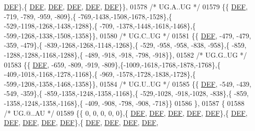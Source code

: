 \begin{DoxyCode}
      \mbox{\hyperlink{1_88_84__epars_8h_a397419fc12b37ed479c8abb9d444d843}{DEF}}\},\{  \mbox{\hyperlink{1_88_84__epars_8h_a397419fc12b37ed479c8abb9d444d843}{DEF}},  \mbox{\hyperlink{1_88_84__epars_8h_a397419fc12b37ed479c8abb9d444d843}{DEF}},  \mbox{\hyperlink{1_88_84__epars_8h_a397419fc12b37ed479c8abb9d444d843}{DEF}},  \mbox{\hyperlink{1_88_84__epars_8h_a397419fc12b37ed479c8abb9d444d843}{DEF}},  \mbox{\hyperlink{1_88_84__epars_8h_a397419fc12b37ed479c8abb9d444d843}{DEF}}\}\},
01578 \textcolor{comment}{/* UG.A..UG */}
01579 \{\{  \mbox{\hyperlink{1_88_84__epars_8h_a397419fc12b37ed479c8abb9d444d843}{DEF}}, -719, -789, -959, -809\},\{ -769,-1438,-1508,-1678,-1528\},\{ -529,-1198,-1268,-1438,-1288\},\{ -709,
      -1378,-1448,-1618,-1468\},\{ -599,-1268,-1338,-1508,-1358\}\},
01580 \textcolor{comment}{/* UG.C..UG */}
01581 \{\{  \mbox{\hyperlink{1_88_84__epars_8h_a397419fc12b37ed479c8abb9d444d843}{DEF}}, -479, -479, -359, -479\},\{ -839,-1268,-1268,-1148,-1268\},\{ -529, -958, -958, -838, -958\},\{ -859,
      -1288,-1288,-1168,-1288\},\{ -489, -918, -918, -798, -918\}\},
01582 \textcolor{comment}{/* UG.G..UG */}
01583 \{\{  \mbox{\hyperlink{1_88_84__epars_8h_a397419fc12b37ed479c8abb9d444d843}{DEF}}, -659, -809, -919, -809\},\{-1009,-1618,-1768,-1878,-1768\},\{ -409,-1018,-1168,-1278,-1168\},\{ -969,
      -1578,-1728,-1838,-1728\},\{ -599,-1208,-1358,-1468,-1358\}\},
01584 \textcolor{comment}{/* UG.U..UG */}
01585 \{\{  \mbox{\hyperlink{1_88_84__epars_8h_a397419fc12b37ed479c8abb9d444d843}{DEF}}, -549, -439, -549, -359\},\{ -859,-1358,-1248,-1358,-1168\},\{ -529,-1028, -918,-1028, -838\},\{ -859,
      -1358,-1248,-1358,-1168\},\{ -409, -908, -798, -908, -718\}\}
01586 \},
01587 \{
01588 \textcolor{comment}{/* UG.@..AU */}
01589 \{\{    0,    0,    0,    0,    0\},\{  \mbox{\hyperlink{1_88_84__epars_8h_a397419fc12b37ed479c8abb9d444d843}{DEF}},  \mbox{\hyperlink{1_88_84__epars_8h_a397419fc12b37ed479c8abb9d444d843}{DEF}},  \mbox{\hyperlink{1_88_84__epars_8h_a397419fc12b37ed479c8abb9d444d843}{DEF}},  \mbox{\hyperlink{1_88_84__epars_8h_a397419fc12b37ed479c8abb9d444d843}{DEF}},  \mbox{\hyperlink{1_88_84__epars_8h_a397419fc12b37ed479c8abb9d444d843}{DEF}}\},\{  
      \mbox{\hyperlink{1_88_84__epars_8h_a397419fc12b37ed479c8abb9d444d843}{DEF}},  \mbox{\hyperlink{1_88_84__epars_8h_a397419fc12b37ed479c8abb9d444d843}{DEF}},  \mbox{\hyperlink{1_88_84__epars_8h_a397419fc12b37ed479c8abb9d444d843}{DEF}},  \mbox{\hyperlink{1_88_84__epars_8h_a397419fc12b37ed479c8abb9d444d843}{DEF}},  \mbox{\hyperlink{1_88_84__epars_8h_a397419fc12b37ed479c8abb9d444d843}{DEF}}\},\{  \mbox{\hyperlink{1_88_84__epars_8h_a397419fc12b37ed479c8abb9d444d843}{DEF}},  \mbox{\hyperlink{1_88_84__epars_8h_a397419fc12b37ed479c8abb9d444d843}{DEF}},  \mbox{\hyperlink{1_88_84__epars_8h_a397419fc12b37ed479c8abb9d444d843}{DEF}},  \mbox{\hyperlink{1_88_84__epars_8h_a397419fc12b37ed479c8abb9d444d843}{DEF}},  

\end{DoxyCode}
